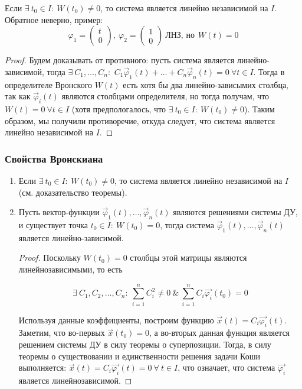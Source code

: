 \begin{theorem}
    Если $\exists ~ t_0 \in I : ~ W(t_0) \neq 0$, то система является линейно независимой на $I$. Обратное неверно,
    пример:
    \begin{equation}
        \varphi_1 = 
        \begin{pmatrix}
            t \\
            0
        \end{pmatrix}, ~
        \varphi_2 = 
        \begin{pmatrix}
            1 \\
            0
        \end{pmatrix} ~ \text{ЛНЗ, но} ~~ W(t) = 0
    \end{equation}
\end{theorem}

\begin{proof}
    Будем доказывать от противного: пусть система является линейно-зависимой, тогда $\exists ~ C_1, \dots, C_n:$
    $C_1 \vec \varphi_1(t) + \dots + C_n \vec \varphi_n(t) = 0 ~ \forall t \in I$. Тогда в определителе Вронского $W(t)$
    есть хотя бы два линейно-зависымих столбца, так как $\vec \varphi_i(t)$ являются столбцами определителя, но тогда получам, что
    $W(t) = 0 ~ \forall t \in I$ (хотя предпологалось, что $\exists ~ t_0 \in I : ~ W(t_0) \neq 0$). Таким образом, мы получили противоречие,
    откуда следует, что система является линейно независимой на $I$.
\end{proof}

\subsubsection*{Свойства Вронскиана}

\begin{enumerate}
    \item Если $\exists ~ t_0 \in I : ~ W(t_0) \neq 0$, то система является линейно независимой на $I$ (см. доказательство теоремы).
    \item Пусть вектор-функции $\vec \varphi_1(t), \dots, \vec \varphi_n(t)$ являются решениями системы ДУ, и существует точка
    $t_0 \in I: ~ W(t_0) = 0$, тогда система $\vec \varphi_1(t), \dots, \vec \varphi_n(t)$ является линейно-зависимой.

    \begin{proof}
        Поскольку $W(t_0) = 0$ столбцы этой матрицы являются линейнозависимыми, то есть 
        
        \[ \exists ~ C_1, C_2, \dots, C_n : ~ \sum_{i = 1}^n C_i^2 \neq 0 ~ \& ~ \sum_{i = 1}^n C_i \vec{\varphi_i}(t_0) = 0 \]
        
        Используя данные коэффициенты, построим функцию $\vec{x}(t) = C_i \vec{\varphi_i}(t)$. Заметим, что во-первых $\vec{x}(t_0) = 0$, а во-вторых данная функция является решением системы ДУ в силу теоремы о суперпозиции. Тогда, в силу теоремы о существовании и единственности решения задачи Коши выполняется: $\vec{x}(t) = C_i \vec{\varphi_i}(t) = 0 ~ \forall ~ t \in I$, что означает, что система $\vec{\varphi_i}$ является линейнозависимой.
    \end{proof}
\end{enumerate}
